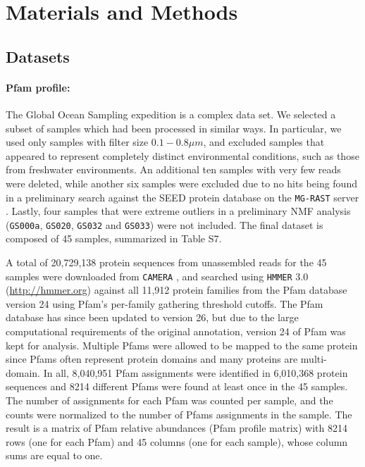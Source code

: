 \section{Materials and Methods}

\subsection*{Datasets}

\paragraph{Pfam profile:} The Global Ocean Sampling expedition \cite{rusch_sorcerer_2007} is a complex data set.  We selected a subset of samples which had been processed in similar ways.  In particular, we used only samples with filter size $0.1-0.8 \mu m$, and excluded samples that appeared to represent completely distinct environmental conditions, such as those from freshwater environments. An additional ten samples with very few reads were deleted, while another six samples were excluded due to no hits being found in a preliminary search against the SEED protein database on the {\tt MG-RAST} server \cite{meyer_metagenomics_2008}. Lastly, four samples that were extreme outliers in a preliminary NMF analysis ({\tt GS000a}, {\tt GS020}, {\tt GS032} and {\tt GS033}) were not included. The final dataset is composed of 45 samples, summarized in Table S7. 

A total of 20,729,138 protein sequences from unassembled reads for the 45 samples were downloaded from {\tt CAMERA} \cite{sun_community_2011}, and searched using {\tt HMMER} 3.0 (\url{http://hmmer.org}) against all 11,912 protein families from the Pfam database version 24 \cite{finn_pfam_2010} using Pfam's per-family gathering threshold cutoffs. The Pfam database has since been updated to version 26, but due to the large computational requirements of the original annotation, version 24 of Pfam was kept for analysis.  Multiple Pfams were allowed to be mapped to the same protein since Pfams often represent protein domains and many proteins are multi-domain. In all, 8,040,951 Pfam assignments were identified in 6,010,368 protein sequences and 8214 different Pfams were found at least once in the 45 samples. The number of assignments for each Pfam was counted per sample, and the counts were normalized to the number of Pfams assignments in the sample.  The result is a matrix of Pfam relative abundances (Pfam profile matrix) with 8214 rows (one for each Pfam) and 45 columns (one for each sample), whose column sums are equal to one. 

